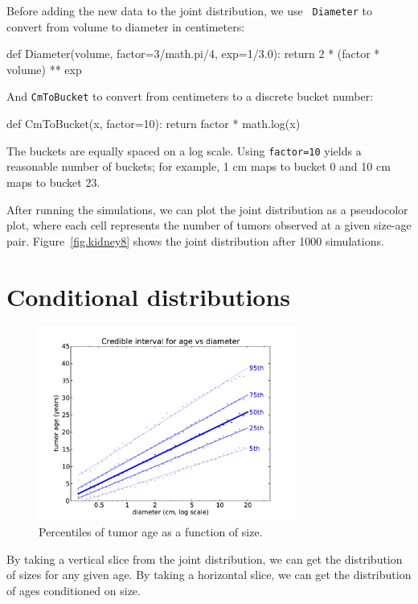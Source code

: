 \documentclass[12pt]{book}
\theoremstyle{exercise}
\begin{document}
Before adding the new data to the joint distribution, we use {\tt
  Diameter} to convert from volume to diameter in centimeters:

\begin{code}
def Diameter(volume, factor=3/math.pi/4, exp=1/3.0):
    return 2 * (factor * volume) ** exp
\end{code}

And
{\tt CmToBucket} to convert from centimeters to a discrete bucket
number:

\begin{code}
def CmToBucket(x, factor=10):
    return factor * math.log(x)
\end{code}

The buckets are equally spaced on a log scale.  Using {\tt factor=10}
yields a reasonable number of buckets; for example,
1 cm maps to bucket 0 and 10 cm maps to bucket 23.

After running the simulations, we can plot the joint distribution
as a pseudocolor plot, where each cell represents the number of
tumors observed at a given size-age pair.
Figure~\ref{fig.kidney8} shows the joint distribution after 1000
simulations.



\section{Conditional distributions}

\begin{figure}
\centerline{\includegraphics[height=2.5in]{figs/kidney7.pdf}}
\caption{Percentiles of tumor age as a function of size.}
\label{fig.kidney7}
\end{figure}

By taking a vertical slice from the joint distribution, we can get the
distribution of sizes for any given age.  By taking a horizontal
slice, we can get the distribution of ages conditioned on size.
\end{document}
